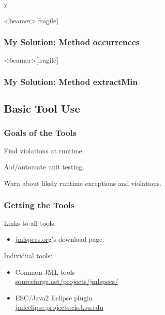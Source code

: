\if y\MAKEHANDOUTS \documentclass[t,compress,landscape,handout]{beamer}
\begin{document}
\begin{frame}<beamer>[fragile]
\frametitle{My Solution: Method occurrences}


\end{frame}

\begin{frame}<beamer>[fragile]
\frametitle{My Solution: Method extractMin}


\end{frame}


\subsection[Tools]{Basic Tool Use}  %

\begin{frame}
\frametitle{Goals of the Tools}
\begin{description}
\item[jmlc:]
Find violations at runtime.

\item[jmlunit:]
Aid/automate unit testing.

\item[ESC/Java2:]
Warn about likely runtime exceptions and violations.
\end{description}
\end{frame}

\begin{frame}
\frametitle{Getting the Tools}

Links to all tools:
\begin{itemize}
\item
\href{http://www.jmlspecs.org/}{jmlspecs.org}'s download page.
\end{itemize}


Individual tools:
\begin{itemize}
\item
Common JML tools \\
\href{http://sourceforge.net/projects/jmlspecs/}{sourceforge.net/projects/jmlspecs/}

\item
ESC/Java2 Eclipse plugin \\
\href{http://jmleclipse.projects.cis.ksu.edu}{jmleclipse.projects.cis.ksu.edu}
\end{itemize}
\end{frame}
\end{document}

